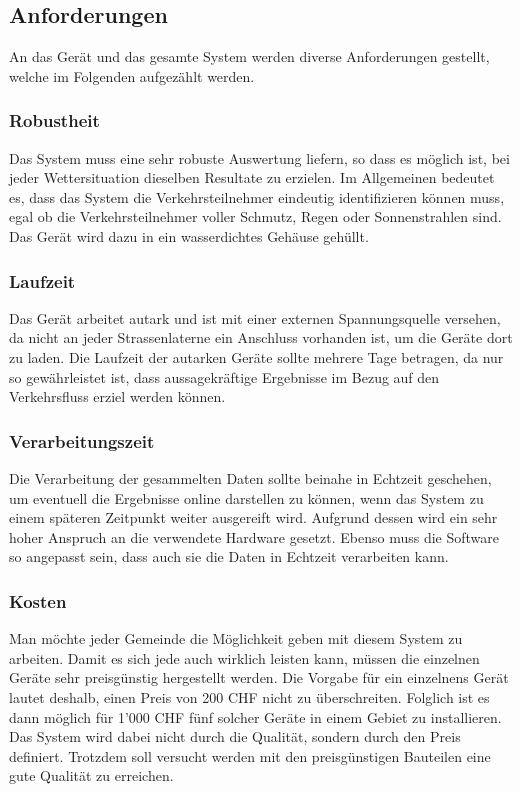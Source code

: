 \subsection{Anforderungen}
An das Gerät und das gesamte System werden diverse Anforderungen gestellt, welche im Folgenden aufgezählt werden.

\subsubsection{Robustheit}
Das System muss eine sehr robuste Auswertung liefern, so dass es möglich ist, bei jeder Wettersituation dieselben Resultate zu erzielen. Im Allgemeinen bedeutet es, dass das System die Verkehrsteilnehmer eindeutig identifizieren können muss, egal ob die Verkehrsteilnehmer voller Schmutz, Regen oder Sonnenstrahlen sind. Das Gerät wird dazu in ein wasserdichtes Gehäuse gehüllt. 

\subsubsection{Laufzeit}
Das Gerät arbeitet autark und ist mit einer externen Spannungsquelle versehen, da nicht an jeder Strassenlaterne ein Anschluss vorhanden ist, um die Geräte dort zu laden. Die Laufzeit der autarken Geräte sollte mehrere Tage betragen, da nur so gewährleistet ist, dass aussagekräftige Ergebnisse im Bezug auf den Verkehrsfluss erziel werden können.  

\subsubsection{Verarbeitungszeit}
Die Verarbeitung der gesammelten Daten sollte beinahe in Echtzeit geschehen, um eventuell die Ergebnisse online darstellen zu können, wenn das System zu einem späteren Zeitpunkt weiter ausgereift wird. Aufgrund dessen wird ein sehr hoher Anspruch an die verwendete Hardware gesetzt. Ebenso muss die Software so angepasst sein, dass auch sie die Daten in Echtzeit verarbeiten kann.

\subsubsection{Kosten}
Man möchte jeder Gemeinde die Möglichkeit geben mit diesem System zu arbeiten. Damit es sich jede auch wirklich leisten kann, müssen die einzelnen Geräte sehr preisgünstig hergestellt werden. Die Vorgabe für ein einzelnens Gerät lautet deshalb, einen Preis von 200 CHF nicht zu überschreiten. Folglich ist es dann möglich für 1'000 CHF fünf solcher Geräte in einem Gebiet zu installieren. Das System wird dabei nicht durch die Qualität, sondern durch den Preis definiert. Trotzdem soll versucht werden mit den preisgünstigen Bauteilen eine gute Qualität zu erreichen.